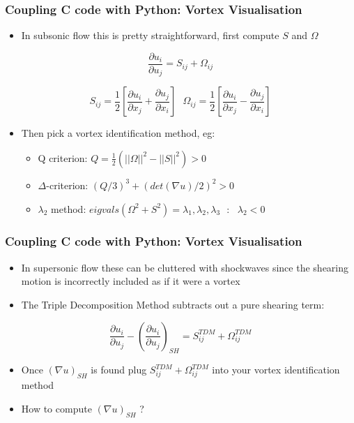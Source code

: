 \documentclass[landscape,10pt]{beamer}
\begin{document}
\begin{frame}[fragile]
\frametitle{Coupling C code with Python: Vortex Visualisation}
\begin{itemize}
\item In subsonic flow this is pretty straightforward, first compute $S$ and $\Omega$
\end{itemize}

\begin{equation}
\frac{\partial u_i}{\partial u_j} = S_{ij} + \Omega_{ij}
\end{equation}

\begin{equation}
S_{ij} = \frac{1}{2} \left[\frac{\partial u_i}{\partial x_j} + \frac{\partial u_j}{\partial x_i} \right] ~~~ \Omega_{ij} = \frac{1}{2} \left[\frac{\partial u_i}{\partial x_j} - \frac{\partial u_j}{\partial x_i} \right]
\end{equation}

\begin{itemize}
\item Then pick a vortex identification method, eg:
\begin{itemize}
\item Q criterion: $Q = \frac{1}{2}(||\Omega||^2 - ||S||^2) > 0$
\vspace{2mm}
\item $\Delta$-criterion: $(Q/3)^3 + (det(\nabla u)/2)^2 > 0$
\vspace{2mm}
\item $\lambda_2$ method: $eigvals(\Omega^2 + S^2) = \lambda_1, \lambda_2, \lambda_3 ~~~ : ~~~ \lambda_2 < 0$
\vspace{2mm}
\end{itemize}
\end{itemize}

\end{frame}

\begin{frame}[fragile]
\frametitle{Coupling C code with Python: Vortex Visualisation}
\begin{itemize}
\item In supersonic flow these can be cluttered with shockwaves since the shearing motion is incorrectly included as if it were a vortex
\item The Triple Decomposition Method subtracts out a pure shearing term:
\end{itemize}

\begin{equation}
\frac{\partial u_i}{\partial u_j} - \left(\frac{\partial u_i}{\partial u_j}\right)_{SH} = S_{ij}^{TDM} + \Omega_{ij}^{TDM}
\end{equation}

\begin{itemize}
\item Once $\left(\nabla u\right)_{SH}$ is found plug $S_{ij}^{TDM} + \Omega_{ij}^{TDM}$ into your vortex identification method
\item How to compute $\left(\nabla u\right)_{SH}$ ?
\end{itemize}
\end{frame}
\end{document}
